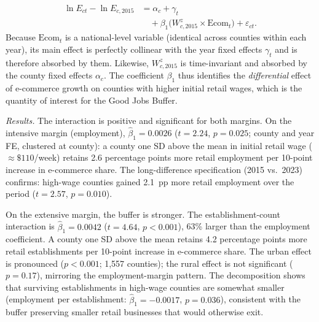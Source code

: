 \documentclass[msom,dblanonrev]{informs4}
\begin{document}
\begin{equation}\label{eq:county}
\begin{aligned}
\ln E_{ct} - \ln E_{c,2015} &= \alpha_c + \gamma_t \\
  &\quad + \beta_1 \bigl(W_{c,2015}^z \times \mathrm{Ecom}_t\bigr) + \varepsilon_{ct}.
\end{aligned}
\end{equation}
Because $\text{Ecom}_t$ is a national-level variable (identical across counties within each year), its main effect is perfectly collinear with the year fixed effects $\gamma_t$ and is therefore absorbed by them. Likewise, $W_{c,2015}^z$ is time-invariant and absorbed by the county fixed effects $\alpha_c$. The coefficient $\beta_1$ thus identifies the \emph{differential} effect of e-commerce growth on counties with higher initial retail wages, which is the quantity of interest for the Good Jobs Buffer.

\textit{Results.} The interaction is positive and significant for both margins. On the intensive margin (employment), $\hat{\beta}_1 = 0.0026$ ($t = 2.24$, $p = 0.025$; county and year FE, clustered at county): a county one SD above the mean in initial retail wage (${\approx}\$110$/week) retains 2.6 percentage points more retail employment per 10-point increase in e-commerce share. The long-difference specification (2015 vs.\ 2023) confirms: high-wage counties gained 2.1~pp more retail employment over the period ($t = 2.57$, $p = 0.010$).

On the extensive margin, the buffer is stronger. The establishment-count interaction is $\hat{\beta}_1 = 0.0042$ ($t = 4.64$, $p < 0.001$), 63\% larger than the employment coefficient. A county one SD above the mean retains 4.2 percentage points more retail establishments per 10-point increase in e-commerce share. The urban effect is pronounced ($p < 0.001$; 1,557 counties); the rural effect is not significant ($p = 0.17$), mirroring the employment-margin pattern. The decomposition shows that surviving establishments in high-wage counties are somewhat smaller (employment per establishment: $\hat{\beta}_1 = -0.0017$, $p = 0.036$), consistent with the buffer preserving smaller retail businesses that would otherwise exit.
\end{document}
